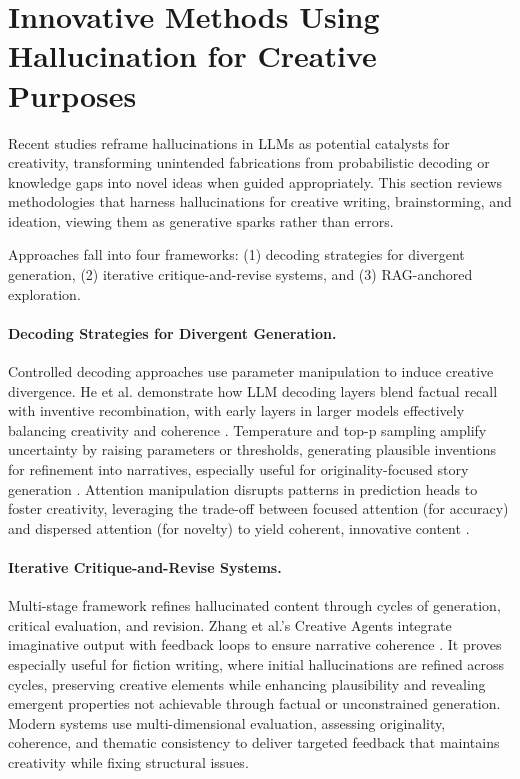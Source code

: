 \documentclass{llncs}
\begin{document}
\section{Innovative Methods Using Hallucination for Creative Purposes}

Recent studies reframe hallucinations in LLMs as potential catalysts for creativity, transforming unintended fabrications from probabilistic decoding or knowledge gaps into novel ideas when guided appropriately. This section reviews methodologies that harness hallucinations for creative writing, brainstorming, and ideation, viewing them as generative sparks rather than errors.

Approaches fall into four frameworks: (1) decoding strategies for divergent generation,  (2) iterative critique-and-revise systems, and (3) RAG-anchored exploration.
\paragraph{Decoding Strategies for Divergent Generation.}
Controlled decoding approaches use parameter manipulation to induce creative divergence. He et al. demonstrate how LLM decoding layers blend factual recall with inventive recombination, with early layers in larger models effectively balancing creativity and coherence \cite{he2025shakespearean}.
Temperature and top-p sampling amplify uncertainty by raising parameters or thresholds, generating plausible inventions for refinement into narratives, especially useful for originality-focused story generation \cite{sun2024hallucinating}.
Attention manipulation disrupts patterns in prediction heads to foster creativity, leveraging the trade-off between focused attention (for accuracy) and dispersed attention (for novelty) to yield coherent, innovative content \cite{he2025shakespearean}.
\paragraph{Iterative Critique-and-Revise Systems.}
Multi-stage framework refines hallucinated content through cycles of generation, critical evaluation, and revision. Zhang et al.'s Creative Agents integrate imaginative output with feedback loops to ensure narrative coherence \cite{zhang2023creative}.
It proves especially useful for fiction writing, where initial hallucinations are refined across cycles, preserving creative elements while enhancing plausibility and revealing emergent properties not achievable through factual or unconstrained generation.
Modern systems use multi-dimensional evaluation, assessing originality, coherence, and thematic consistency to deliver targeted feedback that maintains creativity while fixing structural issues.
\end{document}
